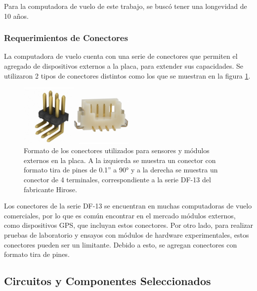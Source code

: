 Para la computadora de vuelo de este trabajo, se buscó tener una longevidad de 10 años.


\subsubsection{Requerimientos de Conectores}


La computadora de vuelo cuenta con una serie de conectores que permiten el agregado de dispositivos externos a la placa, para extender sus capacidades. Se utilizaron 2 tipos de conectores distintos como los que se muestran en la figura \ref{fig:conectores_dupon_df_13}.

\begin{figure}[htb]
    \centering
    \includegraphics[width=0.5\textwidth]{img/conectores_dupon_df_13.png}
    \caption{Formato de los conectores utilizados para sensores y módulos externos en la placa. A la izquierda se muestra un conector con formato tira de pines de 0.1” a 90° y a la derecha se muestra un conector de 4 terminales, correspondiente a la serie DF-13 del fabricante Hirose.}
    \label{fig:conectores_dupon_df_13}
\end{figure}

Los conectores de la serie DF-13 se encuentran en muchas computadoras de vuelo comerciales, por lo que es común encontrar en el mercado módulos externos, como dispositivos GPS, que incluyan estos conectores. Por otro lado, para realizar pruebas de laboratorio y ensayos con módulos de hardware experimentales, estos conectores pueden ser un limitante. Debido a esto, se agregan conectores con formato tira de pines.

\subsection{Circuitos y Componentes Seleccionados}

